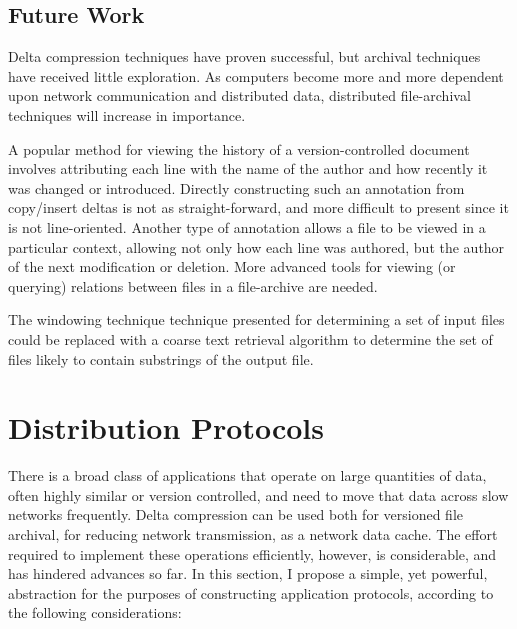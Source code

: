 \documentclass{llncs}
\begin{document}
\subsection{Future Work}

Delta compression techniques have proven successful, but archival
techniques have received little exploration.  As computers become more
and more dependent upon network communication and distributed data,
distributed file-archival techniques will increase in importance.

A popular method for viewing the history of a version-controlled
document involves attributing each line with the name of the author
and how recently it was changed or introduced.  Directly constructing
such an annotation from copy/insert deltas is not as
straight-forward, and more difficult to present since it is not
line-oriented.  Another type of annotation allows a file to be viewed
in a particular context, allowing not only how each line was authored,
but the author of the next modification or deletion.  More advanced
tools for viewing (or querying) relations between files in a
file-archive are needed.

The windowing technique technique presented for determining a set of
input files could be replaced with a coarse text retrieval algorithm
to determine the set of files likely to contain substrings of the
output file.

\section{Distribution Protocols}\label{sec:distribution}

There is a broad class of applications that operate on large
quantities of data, often highly similar or version controlled, and
need to move that data across slow networks frequently.  Delta
compression can be used both for versioned file archival, for reducing
network transmission, as a network data cache.  The effort required to
implement these operations efficiently, however, is considerable, and
has hindered advances so far.  In this section, I propose a simple,
yet powerful, abstraction for the purposes of constructing application
protocols, according to the following considerations:
\end{document}
